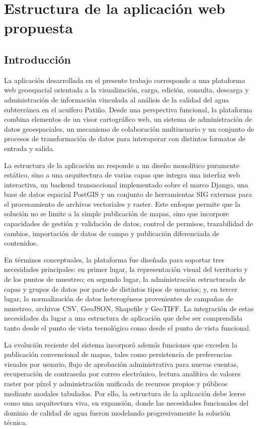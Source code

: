 \documentclass[12pt,a4paper]{report}
\begin{document}
\fi

\chapter{Estructura de la aplicaci\'on web propuesta}

\section{Introducci\'on}

La aplicaci\'on desarrollada en el presente trabajo corresponde a una plataforma web geoespacial orientada a la visualizaci\'on, carga, edici\'on, consulta, descarga y administraci\'on de informaci\'on vinculada al an\'alisis de la calidad del agua subterr\'anea en el acu\'ifero Pati\~no. Desde una perspectiva funcional, la plataforma combina elementos de un visor cartogr\'afico web, un sistema de administraci\'on de datos geoespaciales, un mecanismo de colaboraci\'on multiusuario y un conjunto de procesos de transformaci\'on de datos para interoperar con distintos formatos de entrada y salida.

La estructura de la aplicaci\'on no responde a un dise\~no monol\'itico puramente est\'atico, sino a una arquitectura de varias capas que integra una interfaz web interactiva, un backend transaccional implementado sobre el marco Django, una base de datos espacial PostGIS y un conjunto de herramientas SIG externas para el procesamiento de archivos vectoriales y raster. Este enfoque permite que la soluci\'on no se limite a la simple publicaci\'on de mapas, sino que incorpore capacidades de gesti\'on y validaci\'on de datos, control de permisos, trazabilidad de cambios, importaci\'on de datos de campo y publicaci\'on diferenciada de contenidos.

En t\'erminos conceptuales, la plataforma fue dise\~nada para soportar tres necesidades principales: en primer lugar, la representaci\'on visual del territorio y de los puntos de muestreo; en segundo lugar, la administraci\'on estructurada de capas y grupos de datos por parte de distintos tipos de usuarios; y, en tercer lugar, la normalizaci\'on de datos heterog\'eneos provenientes de campa\~nas de muestreo, archivos CSV, GeoJSON, Shapefile y GeoTIFF. La integraci\'on de estas necesidades da lugar a una estructura de aplicaci\'on que debe ser comprendida tanto desde el punto de vista tecnol\'ogico como desde el punto de vista funcional.

La evoluci\'on reciente del sistema incorpor\'o adem\'as funciones que exceden la publicaci\'on convencional de mapas, tales como persistencia de preferencias visuales por usuario, flujo de aprobaci\'on administrativa para nuevas cuentas, recuperaci\'on de contrase\~na por correo electr\'onico, lectura anal\'itica de valores raster por p\'ixel y administraci\'on unificada de recursos propios y p\'ublicos mediante modales tabulados. Por ello, la estructura de la aplicaci\'on debe leerse como una arquitectura viva, en expansi\'on, donde las necesidades funcionales del dominio de calidad de agua fueron modelando progresivamente la soluci\'on t\'ecnica.
\end{document}
